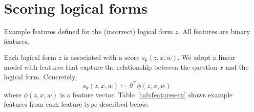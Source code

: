 \section{Scoring logical forms}\label{sec:sempre-scoring}

\begin{table}[t]\centering

\caption[
Example features defined by our floating parser
]{
Example features defined
for the (incorrect) logical form $z$.
All features are binary features.
}\label{tab:features-ex}
\end{table}

Each logical form $z$ is associated with a score $s_\theta(z, x, w)$.
We adopt a linear model with features that capture the relationship
between the question $x$ and the logical form.
Concretely,
\begin{equation}
s_\theta(z, x, w) := \theta^\top \phi(z, x, w)
\end{equation}
where $\phi(z, x, w)$ is a feature vector.
Table~\ref{tab:features-ex}
shows example features from each feature type
described below:

